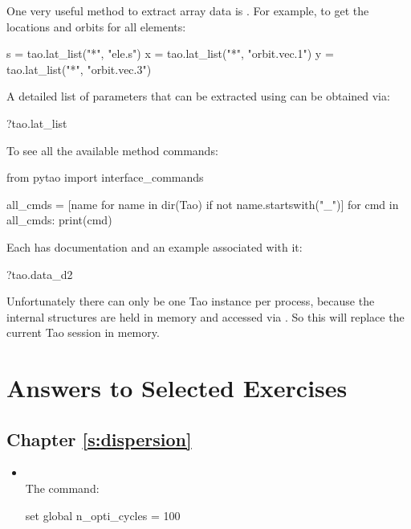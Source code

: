 \documentclass{hitec}     %
\begin{document}
{{{{One very useful method to extract array data is . For example, to get the locations and orbits for all elements:
\begin{code}
s = tao.lat_list("*", "ele.s")
x = tao.lat_list("*", "orbit.vec.1")
y = tao.lat_list("*", "orbit.vec.3")
\end{code}

A detailed list of parameters that can be extracted using  can be obtained via:
\begin{code}
?tao.lat_list
\end{code}

To see all the available method commands:
\begin{code}
from pytao import interface_commands

all_cmds = [name for name in dir(Tao) if not name.startswith("_")]
for cmd in all_cmds:
    print(cmd)
\end{code}

Each has documentation and an example associated with it:
\begin{code}
?tao.data_d2
\end{code}

Unfortunately there can only be one Tao instance per process, because the internal structures are held in memory and accessed via . So this will replace the current Tao session in memory.

\section{Answers to Selected Exercises}

\subsection{Chapter \ref{s:dispersion}}   %

\begin{itemize}[leftmargin=*]
%
\item[]\hspace*{-24pt} \\
The  command:
\begin{code}
set global n_opti_cycles = 100
\end{code}
\end{itemize}

}}}}
\end{document}
